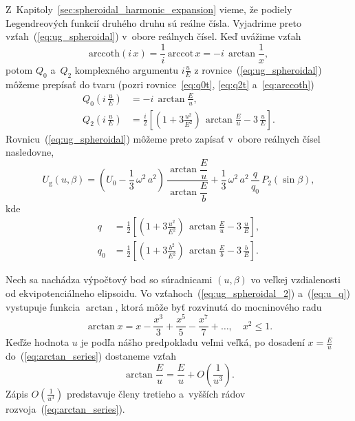\documentclass[a4paper, 12pt]{book}
\newcommand{\gidx}{\mathrm g}
\begin{document}
Z~Kapitoly~\ref{sec:spheroidal_harmonic_expansion} vieme, že podiely 
Legendreových funkcií druhého druhu sú reálne čísla.  Vyjadrime preto 
vzťah~(\ref{eq:ug_spheroidal}) v~obore reálnych čísel.  Keď uvážime vzťah 
\parencite{Moritz1967}
%
\begin{equation}
\mathrm{arccoth} (i \, x) = \frac{1}{i} \, \mathrm{arccot} \, x = -i \, 
\arctan\frac{1}{x}{,}
\end{equation}
%
potom $Q_0$ a~$Q_2$ komplexného argumentu $i \frac{u}{E}$ 
z rovnice~(\ref{eq:ug_spheroidal}) môžeme prepísať do tvaru (pozri 
rovnice~\ref{eq:q0t}, \ref{eq:q2t} a~\ref{eq:arccoth})
%
\begin{align}
Q_0\left( i \, \frac{u}{E} \right) &= -i \, \arctan\frac{E}{u}{,}\\
%
Q_2\left( i \, \frac{u}{E} \right) &= \frac{i}{2} \left[ \left( 
1 + 3 \frac{u^2}{E^2} \right) \, \arctan\frac{E}{u} - 3 \, \frac{u}{E} 
\right]{.}
\end{align}
%
Rovnicu~(\ref{eq:ug_spheroidal}) môžeme preto zapísať v~obore reálnych čísel 
nasledovne,
%
\begin{equation}
\label{eq:ug_spheroidal_2}
U_\gidx(u, \beta) = \left( U_0 - \frac{1}{3} \, \omega^2 \, a^2 \right) \, 
\frac{\arctan\dfrac{E}{u}}{\arctan\dfrac{E}{b}} + \frac{1}{3} \, \omega^2 \, 
a^2 \, \frac{q}{q_0} \, P_2(\sin\beta){,}
\end{equation}
%
kde
%
\begin{align}
\label{eq:u_q}
q &= \frac{1}{2} \left[ \left( 1 + 3 \frac{u^2}{E^2} \right) \, 
\arctan\frac{E}{u} - 3 \, \frac{u}{E} \right]{,}\\
%
q_0 &= \frac{1}{2} \left[ \left( 1 + 3 \frac{b^2}{E^2} \right) \, 
\arctan\frac{E}{b} - 3 \, \frac{b}{E} \right]{.}
\end{align}

Nech sa nachádza výpočtový bod so súradnicami $(u, \beta)$ vo veľkej 
vzdialenosti od ekvipotenciálneho elipsoidu.  Vo 
vzťahoch~(\ref{eq:ug_spheroidal_2}) a~(\ref{eq:u_q}) vystupuje funkcia 
$\arctan$, ktorá môže byť rozvinutá do mocninového radu 
\parencite{Gradshteyn2007}
%
\begin{equation}
\label{eq:arctan_series}
\arctan x = x - \frac{x^3}{3} + \frac{x^5}{5} - \frac{x^7}{7} + \dots{,} \quad 
x^2 \leq 1{.}
\end{equation}
%
Keďže hodnota $u$ je podľa nášho predpokladu veľmi veľká, po dosadení $x 
= \frac{E}{u}$ do~(\ref{eq:arctan_series}) dostaneme vzťah
%
\begin{equation}
\label{eq:eu_atan}
\arctan\frac{E}{u} = \frac{E}{u} + O\left( \frac{1}{u^3} \right){.}
\end{equation}
%
Zápis $O\left( \frac{1}{u^3} \right)$ predstavuje členy tretieho a~vyšších 
rádov rozvoja~(\ref{eq:arctan_series}).
\end{document}
